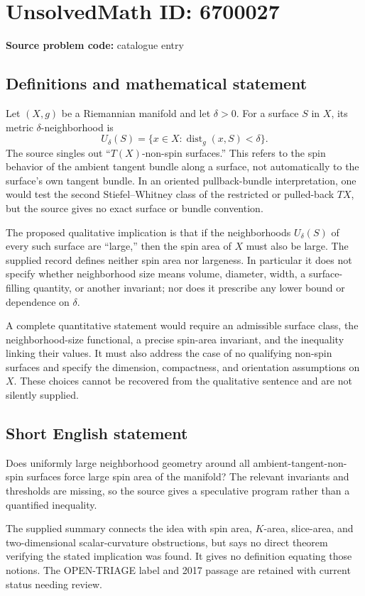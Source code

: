 \documentclass[11pt]{article}
\begin{document}
\section*{UnsolvedMath ID: 6700027}
\textbf{Source problem code:} catalogue entry
\subsection{Definitions and mathematical statement}
Let $(X,g)$ be a Riemannian manifold and let $\delta>0$. For a surface $S$ in $X$, its metric $\delta$-neighborhood is
\[
 U_\delta(S)=\{x\in X:\operatorname{dist}_g(x,S)<\delta\}.
\]
The source singles out ``$T(X)$-non-spin surfaces.'' This refers to the spin behavior of the ambient tangent bundle along a surface, not automatically to the surface's own tangent bundle. In an oriented pullback-bundle interpretation, one would test the second Stiefel--Whitney class of the restricted or pulled-back $TX$, but the source gives no exact surface or bundle convention.

The proposed qualitative implication is that if the neighborhoods $U_\delta(S)$ of every such surface are ``large,'' then the spin area of $X$ must also be large. The supplied record defines neither spin area nor largeness. In particular it does not specify whether neighborhood size means volume, diameter, width, a surface-filling quantity, or another invariant; nor does it prescribe any lower bound or dependence on $\delta$.

A complete quantitative statement would require an admissible surface class, the neighborhood-size functional, a precise spin-area invariant, and the inequality linking their values. It must also address the case of no qualifying non-spin surfaces and specify the dimension, compactness, and orientation assumptions on $X$. These choices cannot be recovered from the qualitative sentence and are not silently supplied.
\subsection{Short English statement}
Does uniformly large neighborhood geometry around all ambient-tangent-non-spin surfaces force large spin area of the manifold? The relevant invariants and thresholds are missing, so the source gives a speculative program rather than a quantified inequality.

The supplied summary connects the idea with spin area, $K$-area, slice-area, and two-dimensional scalar-curvature obstructions, but says no direct theorem verifying the stated implication was found. It gives no definition equating those notions. The OPEN-TRIAGE label and 2017 passage are retained with current status needing review.
\end{document}
